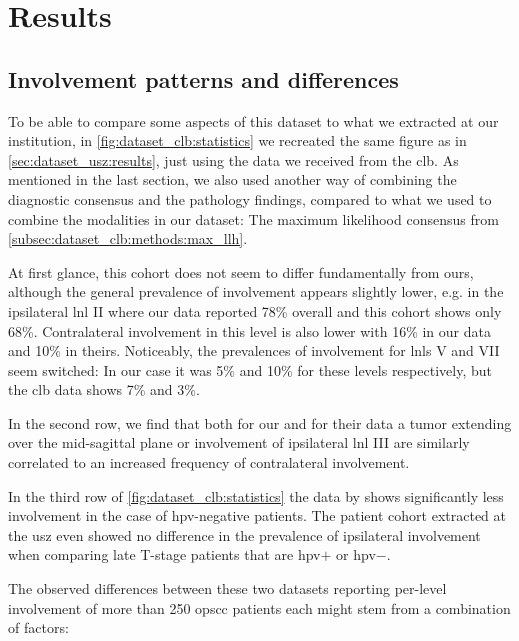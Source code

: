 \documentclass[\relativeRoot/main.tex]{subfiles}
\begin{document}
\section{Results}
\label{sec:dataset_clb:results}

\subsection*{Involvement patterns and differences}
\label{subsec:dataset_clb:results:patterns}

To be able to compare some aspects of this dataset to what we extracted at our institution, in \cref{fig:dataset_clb:statistics} we recreated the same figure as in \cref{sec:dataset_usz:results}, just using the data we received from the \acrlong{clb}. As mentioned in the last section, we also used another way of combining the diagnostic consensus and the pathology findings, compared to what we used to combine the modalities in our dataset: The maximum likelihood consensus from \cref{subsec:dataset_clb:methods:max_llh}.

At first glance, this cohort does not seem to differ fundamentally from ours, although the general prevalence of involvement appears slightly lower, e.g. in the ipsilateral \gls{lnl} II where our data reported 78\% overall and this cohort shows only 68\%. Contralateral involvement in this level is also lower with 16\% in our data and 10\% in theirs. Noticeably, the prevalences of involvement for \glspl{lnl} V and VII seem switched: In our case it was 5\% and 10\% for these levels respectively, but the \gls{clb} data shows 7\% and 3\%.

In the second row, we find that both for our and for their data a tumor extending over the mid-sagittal plane or involvement of ipsilateral \gls{lnl} III are similarly correlated to an increased frequency of contralateral involvement.

In the third row of \cref{fig:dataset_clb:statistics} the data by  shows significantly less involvement in the case of \gls{hpv}-negative patients. The patient cohort extracted at the \gls{usz} even showed no difference in the prevalence of ipsilateral involvement when comparing late T-stage patients that are \gls{hpv}$+$ or \gls{hpv}$-$.

The observed differences between these two datasets reporting per-level involvement of more than 250 \gls{opscc} patients each might stem from a combination of factors:
\end{document}
